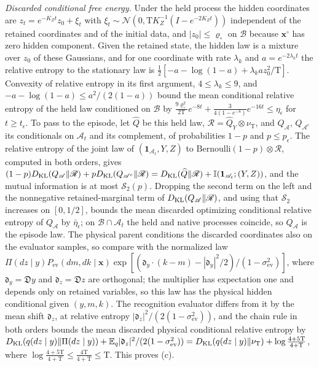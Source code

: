 \emph{Discarded conditional free energy.} Under the held process the hidden
coordinates are \(z_t=e^{-K_Zt}z_0+\xi_t\) with
\(\xi_t\sim\mathcal N(0,\mathrm TK_Z^{-1}(I-e^{-2K_Zt}))\) independent of the
retained coordinates and of the initial data, and \(|z_0|\le\varrho_\circ\) on
\(\mathscr B\) because \(\mathbf x^\circ\) has zero hidden component. Given the
retained state, the hidden law is a mixture over \(z_0\) of these Gaussians,
and for one coordinate with rate \(\lambda_k\) and \(a=e^{-2\lambda_kt}\) the
relative entropy to the stationary law is
\(\tfrac12[-a-\log(1-a)+\lambda_ka z_0^2/\mathrm T]\). Convexity of relative
entropy in its first argument, \(4\le\lambda_k\le9\), and
\(-a-\log(1-a)\le a^2/(2(1-a))\) bound the mean conditional relative entropy of
the held law conditioned on \(\mathscr B\) by
\(\frac{9\varrho_\circ^2}{2\mathrm T}e^{-8t}+\frac{3}{4(1-e^{-8})}e^{-16t}\le\eta_\epsilon\)
for \(t\ge t_\epsilon\). To pass to the episode, let \(\widehat Q\) be this held
law, \(\mathscr R=\widehat Q_Y\otimes\nu_{\mathrm T}\), and \(Q_{\mathscr A}\),
\(Q_{\mathscr A^c}\) its conditionals on \(\mathscr A_t\) and its complement, of
probabilities \(1-p\) and \(p\le p_\epsilon\). The relative entropy of the joint
law of \((\mathbf 1_{\mathscr A_t},Y,Z)\) to
\(\mathrm{Bernoulli}(1-p)\otimes\mathscr R\), computed in both orders, gives
\((1-p)D_{\mathrm{KL}}(Q_{\mathscr A}\Vert\mathscr R)+pD_{\mathrm{KL}}(Q_{\mathscr A^c}\Vert\mathscr R)
=D_{\mathrm{KL}}(\widehat Q\Vert\mathscr R)+\mathbb I(\mathbf 1_{\mathscr A_t};(Y,Z))\), and the
mutual information is at most \(\mathcal S_2(p)\). Dropping the second term on
the left and the nonnegative retained-marginal term of
\(D_{\mathrm{KL}}(Q_{\mathscr A}\Vert\mathscr R)\), and using that \(\mathcal S_2\) increases
on \([0,1/2]\), bounds the mean discarded optimizing conditional relative
entropy of \(Q_{\mathscr A}\) by \(\bar\eta_\epsilon\); on
\(\mathscr B\cap\mathscr A_t\) the held and native processes coincide, so
\(Q_{\mathscr A}\) is the episode law. The physical parent conditions the
discarded coordinates also on the evaluator samples, so compare with the
normalized law
\(\Pi(dz\mid y) P_{\mathrm{ev}}(dm,dk\mid\mathbf x)
\exp[(\mathfrak d_y\cdot(k-m)-|\mathfrak d_y|^2/2)/(1-\sigma^2_{\mathrm{ev}})]\),
where \(\mathfrak d_y=\mathfrak Dy\) and \(\mathfrak d_z=\mathfrak Dz\) are
orthogonal; the multiplier has expectation one and depends only on retained
variables, so this law has the physical hidden conditional given
\((y,m,k)\). The recognition evaluator differs from it by the mean shift
\(\mathfrak d_z\), at relative entropy
\(|\mathfrak d_z|^2/(2(1-\sigma^2_{\mathrm{ev}}))\), and the chain rule in both
orders bounds the mean discarded physical conditional relative entropy by
\(D_{\mathrm{KL}}(q(dz\mid y)\Vert\Pi(dz\mid y))+\mathbb E_q|\mathfrak d_z|^2/(2(1-\sigma^2_{\mathrm{ev}}))
=D_{\mathrm{KL}}(q(dz\mid y)\Vert\nu_{\mathrm T})+\log\frac{4+5\mathrm T}{4+\mathrm T}\), where
\(\log\frac{4+5\mathrm T}{4+\mathrm T}\le\frac{4\mathrm T}{4+\mathrm T}\le\mathrm T\).
This proves (c).

